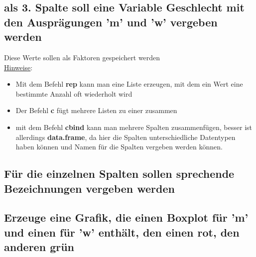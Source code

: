 \documentclass{article}
\begin{document}
\subsection{als 3. Spalte soll eine Variable Geschlecht mit den Ausprägungen 'm' und 'w' vergeben werden}

Diese Werte sollen als Faktoren gespeichert werden \\

\underline{Hinweise}:
\begin{itemize}
	\item Mit dem Befehl \textbf{rep} kann man eine Liste erzeugen, mit dem ein Wert eine bestimmte Anzahl oft wiederholt wird
	\item Der Befehl \textbf{c} fügt mehrere Listen zu einer zusammen
	\item mit dem Befehl \textbf{cbind} kann man mehrere Spalten zusammenfügen, besser ist allerdings \textbf{data.frame}, da hier die Spalten unterschiedliche Datentypen haben können und Namen für die Spalten vergeben werden können.
\end{itemize}

\subsection{Für die einzelnen Spalten sollen sprechende Bezeichnungen vergeben werden}

\subsection{Erzeuge eine Grafik, die einen Boxplot für 'm' und einen für 'w' enthält, den einen rot, den anderen grün}
\end{document}
